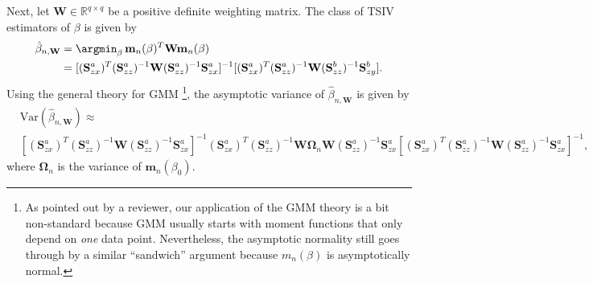 \documentclass[preprint]{imsart}
\begin{document}
Next, let $\mathbf{W} \in \mathbb{R}^{q \times q}$ be a positive definite
weighting matrix. The class of TSIV
estimators of $\beta$ is given by
\begin{equation} \label{eq:beta-hat}
  \begin{split}
    \hat{\beta}_{n,\mathbf{W}} &= \argmin_{\beta}\,\mathbf{m}_n(\beta)^T \mathbf{W}
    \mathbf{m}_n(\beta) \\
    &= [(\mathbf{S}^a_{zx})^T (\mathbf{S}^a_{zz})^{-1}
    \mathbf{W} (\mathbf{S}^a_{zz})^{-1} \mathbf{S}^a_{zx}]^{-1}
    [(\mathbf{S}^a_{zx})^T (\mathbf{S}^a_{zz})^{-1}
    \mathbf{W} (\mathbf{S}^b_{zz})^{-1} \mathbf{S}^b_{zy}].
  \end{split}
\end{equation}
Using the general theory for GMM \citep{hansen1982large}\footnote{As
  pointed out by a reviewer, our application of the GMM theory is a
  bit non-standard because GMM usually starts with moment functions
  that only depend on \emph{one} data point. Nevertheless, the asymptotic
  normality still goes through by a similar ``sandwich'' argument
  because $m_n(\beta)$ is asymptotically normal.}, the
asymptotic variance of $\hat{\beta}_{n,\mathbf{W}}$ is given by
\begin{equation} \label{eq:beta-hat-variance}
  \begin{split}
    &\mathrm{Var}(\hat{\beta}_{n,\mathbf{W}}) \approx \\
    &[(\mathbf{S}^a_{zx})^T (\mathbf{S}^a_{zz})^{-1} \mathbf{W}
    (\mathbf{S}^a_{zz})^{-1} \mathbf{S}^a_{zx}]^{-1}
    (\mathbf{S}^a_{zx})^T (\mathbf{S}^a_{zz})^{-1} \mathbf{W} \bm{\Omega}_n
    \mathbf{W} (\mathbf{S}^a_{zz})^{-1} \mathbf{S}^a_{zx}
    [(\mathbf{S}^a_{zx})^T (\mathbf{S}^a_{zz})^{-1} \mathbf{W}
    (\mathbf{S}^a_{zz})^{-1} \mathbf{S}^a_{zx}]^{-1},
  \end{split}
\end{equation}
where $\bm{\Omega}_n$ is the variance of
$\mathbf{m}_n(\beta_0)$.
\end{document}
